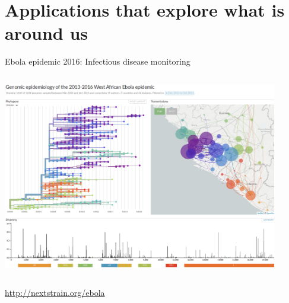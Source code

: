 \documentclass[10pt]{beamer}
\begin{document}
\section{Applications that explore what is around us}


\begin{frame}{Ebola epidemic 2016: Infectious disease monitoring}
	\begin{columns}
		\column{\dimexpr\paperwidth-10pt}
		\begin{center}
			\includegraphics[width=0.9\textwidth]{./figures/nextstrain2.png}\par
		\end{center}
	\end{columns}
	\url{http://nextstrain.org/ebola}
\end{frame}
\end{document}
